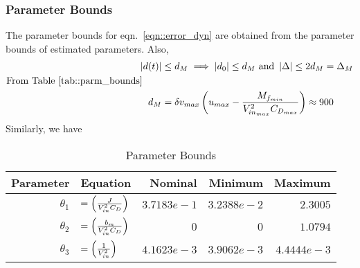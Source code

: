 \subsubsection{Parameter Bounds}
The parameter bounds for eqn.~\ref{eqn::error_dyn} are obtained from the
parameter bounds of estimated parameters. Also,
\begin{align*}
    \left\lvert d(t) \right\rvert &\leq d_M \implies \left\lvert d_0 \right\rvert \leq d_M \text{  and  } \left\lvert \Delta \right\rvert \leq 2d_M = \Delta_M\\
    \text{From Table~\ref{tab::parm_bounds}} \qquad &\\
    d_M &= \delta v_{max} \left( u_{max} - \frac{M_{f_{min}}}{V_{in_{max}}^2 C_{D_{max}}} \right) \approx 900
\end{align*}
Similarly, we have
\begin{table}[H]
    \centering
    \begin{tabular}{r l r r r}
        \hline \hline
        Parameter & Equation & Nominal & Minimum & Maximum\\ \hline \hline
        $\theta_1$ &
        $= \left( \frac{J}{V_{in}^2 C_D} \right)$ &
        $3.7183e-1$ &
        $3.2388e-2$ &
        $2.3005$
        \\
        $\theta_2$ &
        $= \left( \frac{b_m}{V_{in}^2 C_D} \right)$ &
        $0$ &
        $0$ &
        $1.0794$
        \\
        $\theta_3$ &
        $= \left( \frac{1}{V_{in}^2} \right)$ &
        $4.1623e-3$ &
        $3.9062e-3$ &
        $4.4444e-3$
        \\
        \hline \hline
    \end{tabular}
    \caption{Parameter Bounds}
    \label{tab::parm_lims}
\end{table}
